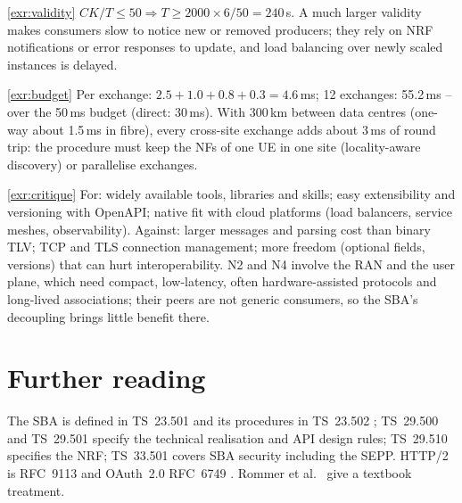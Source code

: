 \documentclass[11pt,a4paper]{article}
\begin{document}
\begin{solutionbox}{\ref{exr:validity}}
$CK/T \le 50 \Rightarrow T \ge 2000\times6/50 = 240$\,s. A much larger validity makes consumers slow to notice new or removed producers;
they rely on NRF notifications or error responses to update, and load balancing over newly scaled instances is delayed.
\end{solutionbox}

\begin{solutionbox}{\ref{exr:budget}}
Per exchange: $2.5 + 1.0 + 0.8 + 0.3 = 4.6$\,ms; 12 exchanges: 55.2\,ms -- over the 50\,ms budget (direct: 30\,ms). With 300\,km between
data centres (one-way about 1.5\,ms in fibre), every cross-site exchange adds about 3\,ms of round trip: the procedure must keep
the NFs of one UE in one site (locality-aware discovery) or parallelise exchanges.
\end{solutionbox}

\begin{solutionbox}{\ref{exr:critique}}
For: widely available tools, libraries and skills; easy extensibility and versioning with OpenAPI; native fit with cloud
platforms (load balancers, service meshes, observability). Against: larger messages and parsing cost than binary TLV; TCP and TLS
connection management; more freedom (optional fields, versions) that can hurt interoperability. N2 and N4 involve the RAN and the
user plane, which need compact, low-latency, often hardware-assisted protocols and long-lived associations; their peers are not
generic consumers, so the SBA's decoupling brings little benefit there.
\end{solutionbox}

\section{Further reading}
The SBA is defined in TS~23.501 \cite{ts23501} and its procedures in TS~23.502 \cite{ts23502}; TS~29.500 \cite{ts29500} and TS~29.501
\cite{ts29501} specify the technical realisation and API design rules; TS~29.510 \cite{ts29510} specifies the NRF; TS~33.501
\cite{ts33501} covers SBA security including the SEPP. HTTP/2 is RFC~9113 \cite{rfc9113} and OAuth~2.0 RFC~6749 \cite{rfc6749}.
Rommer et al.\ \cite{rommer2020core} give a textbook treatment.

\printbibliography[heading=subbibliography,title={\ACNstrRefs}]
\end{document}
